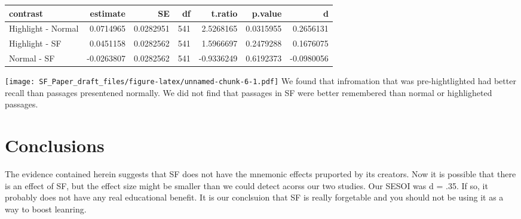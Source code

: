 \documentclass[]{article}
\begin{document}
\begin{longtable}[]{@{}lrrrrrr@{}}
\toprule
contrast & estimate & SE & df & t.ratio & p.value & d\tabularnewline
\midrule
\endhead
Highlight - Normal & 0.0714965 & 0.0282951 & 541 & 2.5268165 & 0.0315955
& 0.2656131\tabularnewline
Highlight - SF & 0.0451158 & 0.0282562 & 541 & 1.5966697 & 0.2479288 &
0.1676075\tabularnewline
Normal - SF & -0.0263807 & 0.0282562 & 541 & -0.9336249 & 0.6192373 &
-0.0980056\tabularnewline
\bottomrule
\end{longtable}

\texttt{[image: SF\_Paper\_draft\_files/figure-latex/unnamed-chunk-6-1.pdf]}
We found that infromation that was pre-hightlighted had better recall
than passages presentened normally. We did not find that passages in SF
were better remembered than normal or highligheted passages.

\hypertarget{conclusions}{%
\section{Conclusions}\label{conclusions}}

The evidence contained herein suggests that SF does not have the
mnemonic effects pruported by its creators. Now it is possible that
there is an effect of SF, but the effect size might be smaller than we
could detect acorss our two studies. Our SESOI was d = .35. If so, it
probably does not have any real educational benefit. It is our
conclsuion that SF is really forgetable and you should not be using it
as a way to boost leanring.
\end{document}
